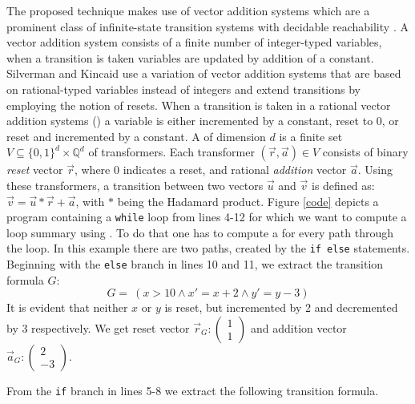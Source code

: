 The proposed technique makes use of vector addition systems which are a prominent class of infinite-state transition systems with decidable reachability \cite{DBLP:conf/rp/HaaseH14}. A vector addition system consists of a finite number of integer-typed variables, when a transition is taken variables are updated by addition of a constant. Silverman and Kincaid use a variation of vector addition systems that are based on rational-typed variables instead of integers and extend transitions by employing the notion of resets. When a transition is taken in a rational vector addition systems (\qvasr) a variable is either incremented by a constant, reset to 0, or reset and incremented by a constant.
A \qvasr of dimension $d$ is a finite set $V \subseteq \{0, 1\}^d \times \mathbb{Q}^d$ of transformers. Each transformer $(\vec{r}, \vec{a}) \in V$ consists of binary \textsl{reset} vector $\vec{r}$, where 0 indicates a reset, and rational \textsl{addition} vector $\vec{a}$. Using these transformers, a transition between two vectors $\vec{u}$ and $\vec{v}$ is defined as: $\vec{v} = \vec{u} * \vec{r} + \vec{a}$, with $*$ being the Hadamard product. Figure \ref{code} depicts a program containing a \texttt{while} loop from lines 4-12 for which we want to compute a loop summary using \qvasr. To do that one has to compute a \qvasr for every path through the loop. In this example there are two paths, created by the \texttt{if else} statements. Beginning with the \texttt{else} branch in lines 10 and 11, we extract the transition formula $G$:
\begin{equation*}
	G= \ (x > 10 \land x' = x + 2 \land y' = y - 3)
\end{equation*}
 It is evident that neither $x$ or $y$ is reset, but incremented by 2 and decremented by 3 respectively. We get reset vector $\vec{r}_G: \begin{pmatrix} 1 \\ 1\end{pmatrix}$ and addition vector $\vec{a}_G: \begin{pmatrix} 2 \\ -3\end{pmatrix}$.  \par
From the \texttt{if} branch in lines 5-8 we extract the following transition formula.
